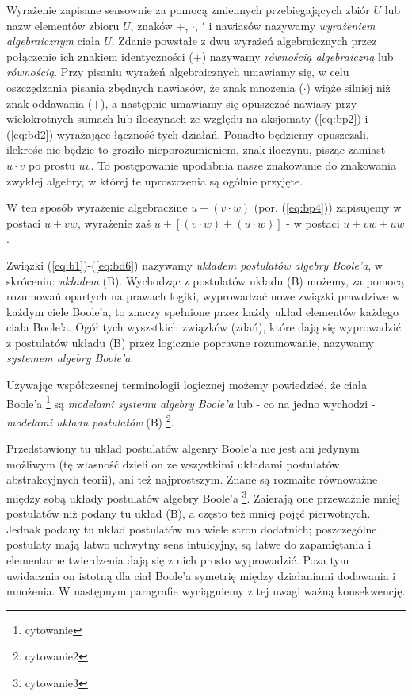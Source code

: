 \documentclass[12 pt, a4paper, leqno]{book}
\numberwithin{equation}{section}
\newcommand{\refb}[1]{(\ref{#1})}
\begin{document}
Wyrażenie zapisane sensownie za pomocą zmiennych przebiegających zbiór $U$ lub nazw elementów zbioru $U$, znaków $+$, $\cdot$, 
$'$ i nawiasów nazywamy \textit{wyrażeniem algebraicznym} ciała $U$. Zdanie powstałe z dwu wyrażeń algebraicznych
przez połączenie ich znakiem identyczności ($+$) nazywamy \textit{równością algebraiczną} lub \textit{równością}.
Przy pisaniu wyrażeń algebraicznych umawiamy się, w celu oszczędzania pisania zbędnych nawiasów, 
że znak mnożenia ($\cdot$) wiąże silniej niż znak oddawania ($+$), a następnie umawiamy się opuszczać nawiasy 
przy wielokrotnych sumach lub iloczynach ze względu na aksjomaty \refb{eq:bp2} i \refb{eq:bd2} wyrażające łączność tych działań.
Ponadto będziemy opuszczali, ilekrośc nie będzie to groziło nieporozumieniem, znak iloczynu, pisząc zamiast $u \cdot v$
po prostu $uv$. To postępowanie upodabnia nasze znakowanie do znakowania zwykłej algebry, w której te uproszczenia 
są ogólnie przyjęte.

W ten sposób wyrażenie algebraczine $u +(v \cdot w)$ (por. \refb{eq:bp4}) zapisujemy w postaci $u+vw$, wyrażenie zaś
$u+[(v \cdot w)+(u \cdot w)]$ - w postaci $u + vw + uw$.

Związki \refb{eq:b1}-\refb{eq:bd6} nazywamy \textit{układem postulatów algebry Boole'a}, w skróceniu: \textit{układem} (B).
Wychodząc z postulatów układu (B) możemy, za pomocą rozumowań opartych na prawach logiki, wyprowadzać nowe związki prawdziwe w każdym ciele Boole'a, to znaczy spełnione
przez każdy układ elementów każdego ciała Boole'a. Ogół tych wyszstkich związków (zdań), które dają się wyprowadzić
z postulatów układu (B) przez logicznie poprawne rozumowanie, nazywamy \textit{systemem algebry Boole'a}.

Używając współczesnej terminologii logicznej możemy powiedzieć, że ciała Boole'a \footnote{cytowanie} są 
\textit{modelami systemu algebry Boole'a} lub - co na jedno wychodzi - \textit{modelami układu postulatów} (B) \footnote{cytowanie2}.

Przedstawiony tu układ postulatów algenry Boole'a nie jest ani jedynym możliwym (tę własność dzieli on
ze wszystkimi układami postulatów abstrakcyjnych teorii), ani też najprostszym. Znane są rozmaite równoważne
między sobą układy postulatów algebry Boole'a \footnote{cytowanie3}. Zaierają one przeważnie mniej postulatów niż
podany tu układ (B), a często też mniej pojęć pierwotnych. Jednak podany tu układ postulatów ma wiele stron dodatnich;
poszczególne postulaty mają łatwo uchwytny sens intuicyjny, są łatwe do zapamiętania i elementarne twierdzenia dają się z nich 
prosto wyprowadzić. Poza tym uwidacznia on istotną dla ciał Boole'a symetrię między działaniami dodawania i mnożenia. 
W następnym paragrafie wyciągniemy z tej uwagi ważną konsekwencję.
\end{document}
